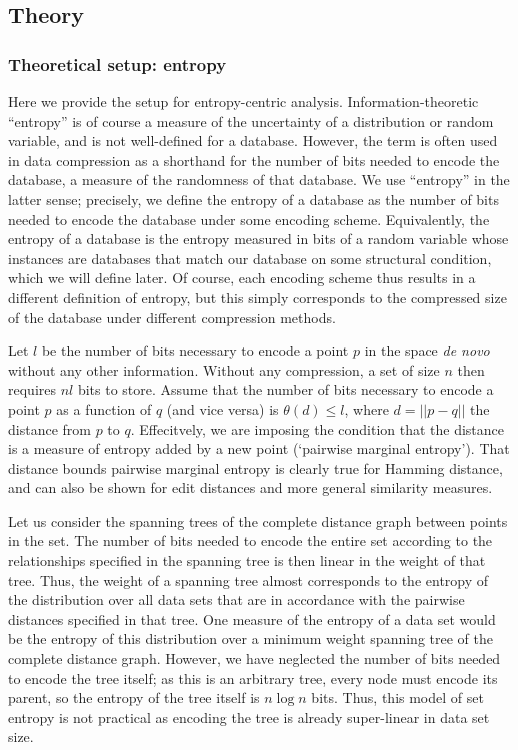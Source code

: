 \documentclass[review,preprint,12pt]{elsarticle}
\theoremstyle{definition}
\theoremstyle{remark}
\numberwithin{equation}{section}
\begin{document}
\subsection{Theory}

\subsubsection{Theoretical setup: entropy}
Here we provide the setup for entropy-centric analysis.
Information-theoretic ``entropy'' is of course a measure of the uncertainty of a distribution or random variable, and is not well-defined for a database.
However, the term is often used in data compression as a shorthand for the number of bits needed to encode the database, a measure of the randomness of that database.
We use ``entropy'' in the latter sense; precisely, we define the entropy of a database as the number of bits needed to encode the database under some encoding scheme.
Equivalently, the entropy of a database is the entropy measured in bits of a random variable whose instances are databases that match our database on some structural condition, which we will define later.
Of course, each encoding scheme thus results in a different definition of entropy, but this simply corresponds to the compressed size of the database under different compression methods.

Let $l$ be the number of bits necessary to encode a point $p$ in the space \textit{de novo} without any other information.
Without any compression, a set of size $n$ then requires $nl$ bits to store.
Assume that the number of bits necessary to encode a point $p$ as a function of $q$ (and vice versa) is $\theta(d) \le l$, where $d = ||p -q||$ the distance from $p$ to $q$.
Effecitvely, we are imposing the condition that the distance is a measure of entropy added by a new point (`pairwise marginal entropy').
That distance bounds pairwise marginal entropy is clearly true for Hamming distance, and can also be shown for edit distances and more general similarity measures.

Let us consider the spanning trees of the complete distance graph between points in the set.
The number of bits needed to encode the entire set according to the relationships specified in the spanning tree is then linear in the weight of that tree.
Thus, the weight of a spanning tree almost corresponds to the entropy of the distribution over all data sets that are in accordance with the pairwise distances specified in that tree.
One measure of the entropy of a data set would be the entropy of this distribution over a minimum weight spanning tree of the complete distance graph.
However, we have neglected the number of bits needed to encode the tree itself; as this is an arbitrary tree, every node must encode its parent, so the entropy of the tree itself is $n \log n$ bits.
Thus, this model of set entropy is not practical as encoding the tree is already super-linear in data set size.
\end{document}

